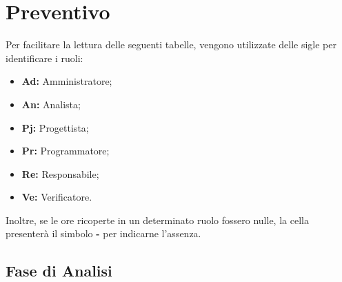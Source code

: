 \section{Preventivo}
Per facilitare la lettura delle seguenti tabelle, vengono utilizzate delle sigle 
per identificare i ruoli:
\begin{itemize}
\item \textbf{Ad:} Amministratore;
\item \textbf{An:} Analista;
\item \textbf{Pj:} Progettista;
\item \textbf{Pr:} Programmatore;
\item \textbf{Re:} Responsabile;
\item \textbf{Ve:} Verificatore.
\end{itemize}
\noindent
Inoltre, se le ore ricoperte in un determinato ruolo fossero nulle, la cella 
presenterà il simbolo \textbf{-} per indicarne l'assenza. 

\subsection{Fase di Analisi}
